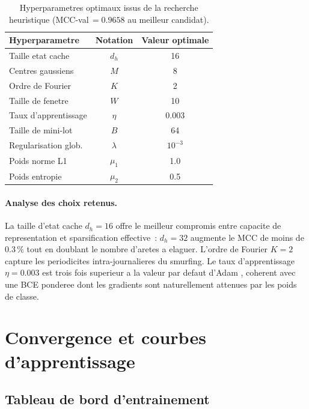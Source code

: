 \documentclass[11pt,a4paper,twocolumn]{article}
\begin{document}
\begin{table}[H]
\centering
\caption{Hyperparametres optimaux issus de la recherche heuristique
         (MCC-val$\,= 0.9658$ au meilleur candidat).}
\label{tab:hp}
\renewcommand{\arraystretch}{1.2}
\small
\begin{tabular}{lcc}
\toprule
\textbf{Hyperparametre} & \textbf{Notation} & \textbf{Valeur optimale} \\
\midrule
Taille etat cache    & $d_h$          & 16       \\
Centres gaussiens    & $M$            & 8        \\
Ordre de Fourier     & $K$            & 2        \\
Taille de fenetre    & $W$            & 10       \\
Taux d'apprentissage & $\eta$         & 0.003    \\
Taille de mini-lot   & $B$            & 64       \\
Regularisation glob. & $\lambda$      & $10^{-3}$\\
Poids norme L1       & $\mu_1$        & 1.0      \\
Poids entropie       & $\mu_2$        & 0.5      \\
\bottomrule
\end{tabular}
\end{table}

\paragraph{Analyse des choix retenus.}
La taille d'etat cache $d_h=16$ offre le meilleur compromis entre
capacite de representation et sparsification effective~: $d_h=32$
augmente le MCC de moins de $0.3\,\%$ tout en doublant le nombre
d'aretes a elaguer. L'ordre de Fourier $K=2$ capture les periodicites
intra-journalieres du smurfing. Le taux d'apprentissage $\eta=0.003$
est trois fois superieur a la valeur par defaut d'Adam
\cite{kingma2014adam}, coherent avec une BCE ponderee dont les
gradients sont naturellement attenues par les poids de classe.

\FloatBarrier
\section{Convergence et courbes d'apprentissage}

\subsection{Tableau de bord d'entrainement}
\end{document}
